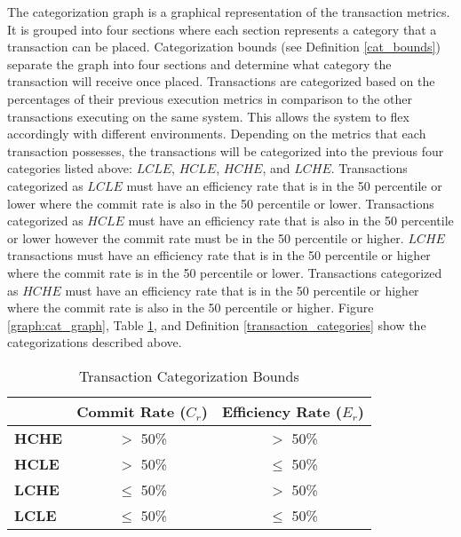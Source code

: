 \documentclass[conference]{IEEEtran}
\begin{document}
The categorization graph is a graphical representation of the transaction metrics. It is grouped into four sections where each section represents a category that a transaction can be placed. Categorization bounds (see Definition \ref{cat_bounds}) separate the graph into four sections and determine what category the transaction will receive once placed. Transactions are categorized based on the percentages of their previous execution metrics in comparison to the other transactions executing on the same system. This allows the system to flex accordingly with different environments. Depending on the metrics that each transaction possesses, the transactions will be categorized into the previous four categories listed above: $LCLE$, $HCLE$, $HCHE$, and $LCHE$. Transactions categorized as $LCLE$ must have an efficiency rate that is in the 50 percentile or lower where the commit rate is also in the 50 percentile or lower. Transactions categorized as $HCLE$ must have an efficiency rate that is also in the 50 percentile or lower however the commit rate must be in the 50 percentile or higher. $LCHE$ transactions must have an efficiency rate that is in the 50 percentile or higher where the commit rate is in the 50 percentile or lower. Transactions categorized as $HCHE$ must have an efficiency rate that is in the 50 percentile or higher where the commit rate is also in the 50 percentile or higher. Figure \ref{graph:cat_graph}, Table \ref{tbl:default_tmetrics}, and Definition \ref{transaction_categories} show the categorizations described above.

\begin{table}[h]
\captionsetup{justification=centering}
\centering
\begin{tabular}{l|c|c|}
\cline{2-3}
                                          & \multicolumn{1}{l|}{\textbf{Commit Rate ($C_{r}$)}} & \multicolumn{1}{l|}{\textbf{Efficiency Rate ($E_{r}$)}} \\ \hline
\multicolumn{1}{|l|}{\textbf{HCHE}}  & $>$ 50\%                          & $>$ 50\%                                \\ \hline
\multicolumn{1}{|l|}{\textbf{HCLE}}  & $>$ 50\%                       & $\le$ 50\%                               \\ \hline
\multicolumn{1}{|l|}{\textbf{LCHE}} & $\le$ 50\%                          & $>$ 50\%                                  \\ \hline
\multicolumn{1}{|l|}{\textbf{LCLE}} & $\le$ 50\%                       & $\le$ 50\%                                 \\ \hline
\end{tabular}
\caption{Transaction Categorization Bounds} %
\label{tbl:default_tmetrics} %
\end{table}
\end{document}
